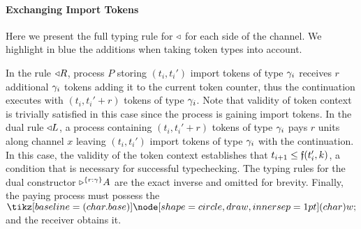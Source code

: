 \paragraph*{\textbf{Exchanging Import Tokens}}
Here we present the full typing rule for $\getpot$ for each side of the channel.
We highlight in blue the additions when taking token types into account.
In the rule $\getpot R$, process $P$ storing $(t_i, t_i')$ import tokens of type $\K_i$
receives $r$ additional $\K_i$ tokens adding it to the current token counter, thus
the continuation executes with $(t_i, t_i'+r)$ tokens of type $\K_i$.
Note that validity of token context is trivially satisfied in this case since the
process is gaining import tokens.
%
In the dual rule $\getpot L$, a process containing $(t_i, t_i'+r)$ tokens of type $\K_i$
pays $r$ units along channel $x$ leaving $(t_i, t_i')$ import tokens of type $\K_i$ with
the continuation.
In this case, the validity of the token context establishes that $t_{i+1} \leq \GlobalF(t_i',k)$,
a condition that is necessary for successful typechecking.
The typing rules for the dual constructor $\tpaypot{A}{r : \K}$
are the exact inverse and omitted for brevity.
Finally, the paying process must possess the $\wt$ and the receiver obtains it.


